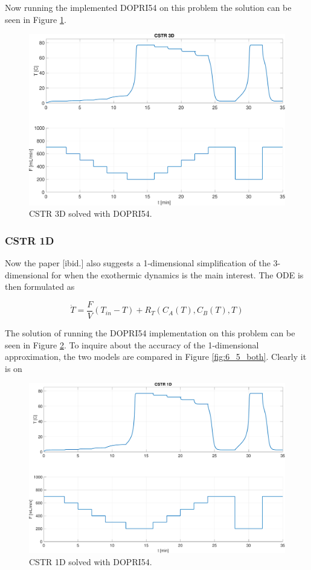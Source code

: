 Now running the implemented DOPRI54 on this problem the solution can be seen in Figure \ref{fig:6_5_3d}.


\begin{figure}[h]
    \centering
    \includegraphics[width=\textwidth]{plots/6_5_3D.pdf}
    \caption{CSTR 3D solved with DOPRI54.}
    \label{fig:6_5_3d}
\end{figure}



\subsubsection*{CSTR 1D}
Now the paper [ibid.] also suggests a 1-dimensional simplification of the 3-dimensional for when the exothermic dynamics is the main interest. The ODE is then formulated as

\begin{equation}
\dot{T}=\frac{F}{V}\left(T_{i n}-T\right)+R_{T}\left(C_{A}(T), C_{B}(T), T\right)
\end{equation}

The solution of running the DOPRI54 implementation on this problem can be seen in Figure \ref{fig:6_5_1d}. To inquire about the accuracy of the 1-dimensional approximation, the two models are compared in Figure \ref{fig:6_5_both}. Clearly it is on
\begin{figure}[h]
    \centering
    \includegraphics[width=\textwidth]{plots/6_5_1D.pdf}
    \caption{CSTR 1D solved with DOPRI54.}
    \label{fig:6_5_1d}
\end{figure}

